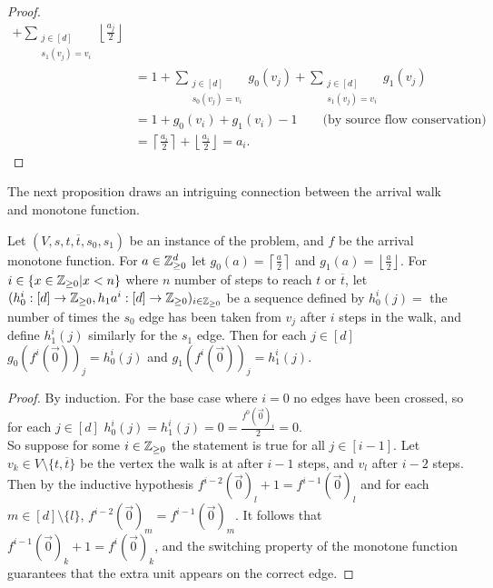 \begin{proof}
\begin{align*}
      + \sum_{\substack{j \in [d] \\ s_1(v_j) = v_i}} \left\lfloor \frac{a_j}{2} \right\rfloor \\
      &= 1 + \sum_{\substack{j \in [d] \\ s_0(v_j) = v_i}}  g_0(v_j) 
      + \sum_{\substack{j \in [d] \\ s_1(v_j) = v_i}}  g_1(v_j) \\
      &= 1 + g_0(v_i) + g_1(v_i) - 1 \qquad \text{(by source flow conservation)} \\
      &= \left\lceil \frac{a_i}{2} \right\rceil + \left\lfloor \frac{a_i}{2} \right\rfloor = a_i.
    \end{align*}
  \end{proof}
  The next proposition draws an intriguing connection between the arrival walk and monotone function.
  \newcommand{\lc}{\left\lceil}
  \newcommand{\rc}{\right\rceil}
  \newcommand{\lf}{\left\lfloor}
  \newcommand{\rf}{\right\rfloor}
  \begin{prop}\label{kleeneTarskiIsWalk}
    Let $(V, s, t, \overline{t}, s_0, s_1)$ be an instance of the problem, and $f$ be the 
    arrival monotone function. For $a \in \mathbb{Z}_{\geq 0}^d$ let $g_0(a) = \lc \frac{a}{2} \rc$ and 
    $g_1(a) = \lf \frac{a}{2} \rf$. For $i \in \{x \in \mathbb{Z}_{\geq 0} | x < n \}$ where $n$ number of steps
    to reach $t$ or $\overline{t}$, let 
    $(h_0^i : [d] \to \mathbb{Z}_{\geq 0}, h_1a^i : [d] \to \mathbb{Z}_{\geq 0})_{i \in \mathbb{Z}_{\geq 0}}$
    be a sequence defined by $h_0^i(j) = $ the number of times the $s_0$ edge has been taken from $v_j$
    after $i$ steps in the walk, and define $h_1^i(j)$ similarly for the $s_1$ edge. Then for each $j \in [d]$
    $g_0(f^i(\vec{0}))_j = h_0^i(j)$ and $g_1(f^i(\vec{0}))_j = h_1^i(j)$.
  \end{prop}
  \begin{proof}
    By induction. For the base case where $i = 0$ no edges have been crossed, so for each
    $j \in [d]$ $h_0^i(j) = h_1^i(j) = 0 = \frac{f^0(\vec{0})_i}{2} = 0$. \\
    So suppose for some $i \in \mathbb{Z}_{\geq 0}$ the statement is true for all $j \in [i-1]$.
    Let $v_k \in V \setminus \{t, \overline{t}\}$ be the vertex the walk is at after $i - 1$ steps, and $v_l$ after $i-2$ steps.
    Then by the inductive hypothesis $f^{i-2}(\vec{0})_l + 1 = f^{i-1}(\vec{0})_l$ and for each
    $m \in [d] \setminus \{l\}$, $f^{i-2}(\vec{0})_m = f^{i-1}(\vec{0})_m$. It follows that
    $f^{i - 1}(\vec{0})_k + 1 = f^{i}(\vec{0})_k$, and the switching property of the monotone function
    guarantees that the extra unit appears on the correct edge.
  \end{proof}
